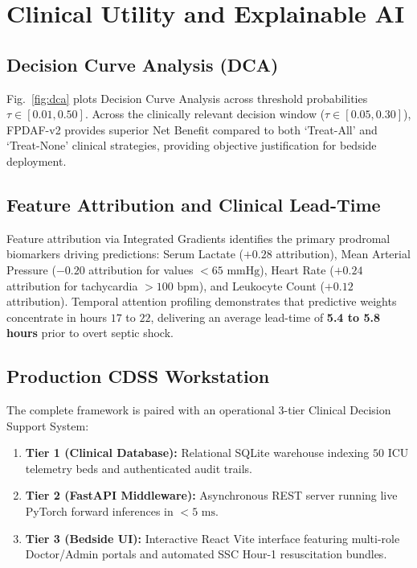 \documentclass[10pt,a4paper,twocolumn,twoside]{article}
\begin{document}
\section{Clinical Utility and Explainable AI}

\subsection{Decision Curve Analysis (DCA)}
Fig.~\ref{fig:dca} plots Decision Curve Analysis across threshold probabilities $\tau \in [0.01, 0.50]$. Across the clinically relevant decision window ($\tau \in [0.05, 0.30]$), FPDAF-v2 provides superior Net Benefit compared to both `Treat-All' and `Treat-None' clinical strategies, providing objective justification for bedside deployment.

\subsection{Feature Attribution and Clinical Lead-Time}
Feature attribution via Integrated Gradients identifies the primary prodromal biomarkers driving predictions: Serum Lactate ($+0.28$ attribution), Mean Arterial Pressure ($-0.20$ attribution for values $<65\text{ mmHg}$), Heart Rate ($+0.24$ attribution for tachycardia $>100\text{ bpm}$), and Leukocyte Count ($+0.12$ attribution). Temporal attention profiling demonstrates that predictive weights concentrate in hours $17$ to $22$, delivering an average lead-time of \textbf{5.4 to 5.8 hours} prior to overt septic shock.

\subsection{Production CDSS Workstation}
The complete framework is paired with an operational 3-tier Clinical Decision Support System:
\begin{enumerate}
    \item \textbf{Tier 1 (Clinical Database):} Relational SQLite warehouse indexing $50$ ICU telemetry beds and authenticated audit trails.
    \item \textbf{Tier 2 (FastAPI Middleware):} Asynchronous REST server running live PyTorch forward inferences in $<5\text{ ms}$.
    \item \textbf{Tier 3 (Bedside UI):} Interactive React Vite interface featuring multi-role Doctor/Admin portals and automated SSC Hour-1 resuscitation bundles.
\end{enumerate}
\end{document}
